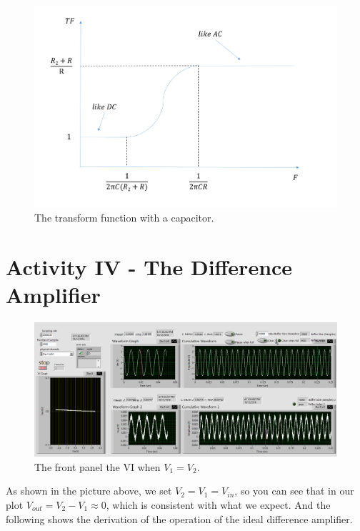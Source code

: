 \documentclass[11pt]{article}
\begin{document}
\begin{figure}[H]
 \begin{center}
  \includegraphics[width=\linewidth/1]{act3_4b}
  \caption{The transform function with a capacitor.}
  \label{fig:act3_4b}
 \end{center}
\end{figure}


\section{Activity IV - The Difference Amplifier}

\begin{figure}[H]
 \begin{center}
  \includegraphics[width=\linewidth/1]{act4AC_V1eqV2}
  \caption{The front panel the VI when $V_{1}=V_{2}$.}
  \label{fig:act4AC_V1eqV2}
 \end{center}
\end{figure}

As shown in the picture above, we set $V_{2}=V_{1}=V_{in}$, so you can see that in our plot $V_{out}=V_{2}-V_{1} \approx 0$, which is consistent with what we expect. And the following shows the derivation of the operation of the ideal difference amplifier.
\end{document}
